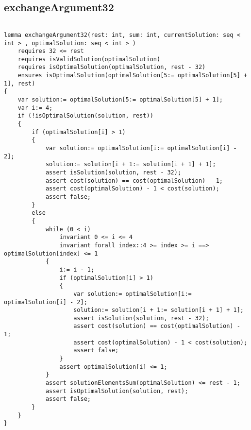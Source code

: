 \subsection{exchangeArgument32}
\begin{lstlisting}
    
lemma exchangeArgument32(rest: int, sum: int, currentSolution: seq < int > , optimalSolution: seq < int > )
    requires 32 <= rest
    requires isValidSolution(optimalSolution)
    requires isOptimalSolution(optimalSolution, rest - 32)
    ensures isOptimalSolution(optimalSolution[5:= optimalSolution[5] + 1], rest) 
{
    var solution:= optimalSolution[5:= optimalSolution[5] + 1];
    var i:= 4;
    if (!isOptimalSolution(solution, rest)) 
    {
        if (optimalSolution[i] > 1) 
        {
            var solution:= optimalSolution[i:= optimalSolution[i] - 2];
            solution:= solution[i + 1:= solution[i + 1] + 1];
            assert isSolution(solution, rest - 32);
            assert cost(solution) == cost(optimalSolution) - 1;
            assert cost(optimalSolution) - 1 < cost(solution);
            assert false;
        } 
        else
        {
            while (0 < i)
                invariant 0 <= i <= 4
                invariant forall index::4 >= index >= i ==> optimalSolution[index] <= 1 
            {
                i:= i - 1;
                if (optimalSolution[i] > 1) 
                {
                    var solution:= optimalSolution[i:= optimalSolution[i] - 2];
                    solution:= solution[i + 1:= solution[i + 1] + 1];
                    assert isSolution(solution, rest - 32);
                    assert cost(solution) == cost(optimalSolution) - 1;
                    assert cost(optimalSolution) - 1 < cost(solution);
                    assert false;
                }
                assert optimalSolution[i] <= 1;
            }
            assert solutionElementsSum(optimalSolution) <= rest - 1;
            assert isOptimalSolution(solution, rest);
            assert false;
        }
    }
}

\end{lstlisting}

